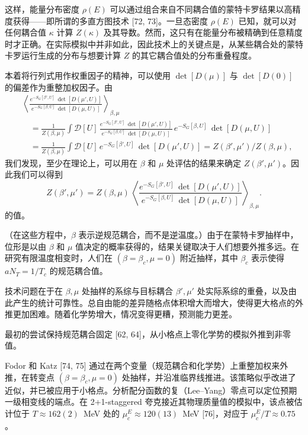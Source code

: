 这样，能量分布密度 $\rho(E)$ 可以通过组合来自不同耦合值的蒙特卡罗结果以高精度获得——即所谓的多直方图技术 [72, 73]。一旦态密度 $\rho(E)$ 已知，就可以对任何耦合值 $\kappa$ 计算 $Z(\kappa)$ 及其导数。然而，这只有在能量分布被精确到任意精度时才正确。在实际模拟中并非如此，因此技术上的关键点是，从某些耦合处的蒙特卡罗运行生成的分布与想要计算 $Z$ 的其它耦合值处的分布重叠程度。

本着将行列式用作权重因子的精神，可以使用 $\det[D(\mu)]$ 与 $\det[D(0)]$ 的偏差作为重整加权因子。由
\begin{equation}
\begin{split}
  &\left\langle
    \frac{e^{-S_G[\beta',U]}\,\det[D(\mu',U)]}
         {e^{-S_G[\beta,U]}\,\det[D(\mu,U)]}
  \right\rangle_{\beta,\mu}\\
  &\quad= \frac{1}{Z(\beta,\mu)}\int\mathcal{D}[U]\,
     \frac{e^{-S_G[\beta',U]}\,\det[D(\mu',U)]}
          {e^{-S_G[\beta,U]}\,\det[D(\mu,U)]}\,
     e^{-S_G[\beta,U]}\,\det[D(\mu,U)] \\
  &\quad= \frac{1}{Z(\beta,\mu)}\int\mathcal{D}[U]\,
     e^{-S_G[\beta',U]}\,\det[D(\mu',U)]
  = Z(\beta',\mu')/Z(\beta,\mu),
\end{split}
\end{equation}
我们发现，至少在理论上，可以用在 $\beta$ 和 $\mu$ 处评估的结果来确定 $Z(\beta',\mu')$。因此我们可以得到
\begin{equation}
  Z(\beta',\mu') = Z(\beta,\mu)\,
  \left\langle
    \frac{e^{-S_G[\beta',U]}\,\det[D(\mu',U)]}
         {e^{-S_G[\beta,U]}\,\det[D(\mu,U)]}
  \right\rangle_{\beta,\mu}.
\end{equation}
的值。

（在这些方程中，$\beta$ 表示逆规范耦合，而不是逆温度。）由于在蒙特卡罗抽样中，位形是以由 $\beta$ 和 $\mu$ 值决定的概率获得的，结果关键取决于人们想要外推多远。在研究有限温度相变时，人们在 $(\beta = \beta_c, \mu = 0)$ 附近抽样，其中 $\beta_c$ 表示使得 $aN_T = 1/T_c$ 的规范耦合值。

技术问题在于在 $\beta,\mu$ 处抽样的系综与目标耦合 $\beta',\mu'$ 处实际系综的重叠，以及由此产生的统计可靠性。总自由能的差异随格点体积增大而增大，使得更大格点的外推更加困难。随着化学势增大，情况变得更糟，预测能力更差。

最初的尝试保持规范耦合固定 [62, 64]，从小格点上零化学势的模拟外推到非零值。

Fodor 和 Katz [74, 75] 通过在两个变量（规范耦合和化学势）上重整加权来外推，在转变点 $(\beta = \beta_c, \mu = 0)$ 处抽样，并沿准临界线推进。该策略似乎改进了近似，并已被应用于小格点。分析配分函数的复（Lee--Yang）零点可以定位预期一级相变线的端点。在 2+1-staggered 夸克接近其物理质量值的模拟中，该点被估计位于 $T \approx 162(2)$~MeV 处的 $\mu_c^E \approx 120(13)$~MeV [76]，对应于 $\mu_c^E/T \approx 0.75$。

